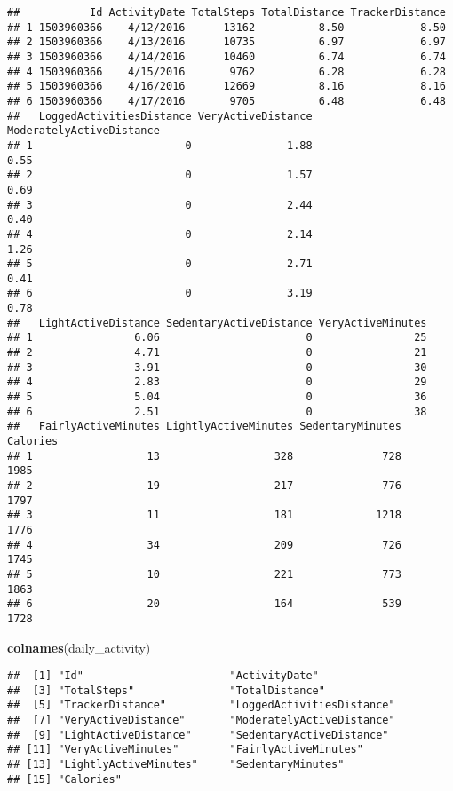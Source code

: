 \documentclass[
]{article}
\newenvironment{Shaded}{\begin{snugshade}}{\end{snugshade}}
\newcommand{\FunctionTok}[1]{\textcolor[rgb]{0.13,0.29,0.53}{\textbf{#1}}}
\newcommand{\NormalTok}[1]{#1}
\begin{document}
\begin{verbatim}
##           Id ActivityDate TotalSteps TotalDistance TrackerDistance
## 1 1503960366    4/12/2016      13162          8.50            8.50
## 2 1503960366    4/13/2016      10735          6.97            6.97
## 3 1503960366    4/14/2016      10460          6.74            6.74
## 4 1503960366    4/15/2016       9762          6.28            6.28
## 5 1503960366    4/16/2016      12669          8.16            8.16
## 6 1503960366    4/17/2016       9705          6.48            6.48
##   LoggedActivitiesDistance VeryActiveDistance ModeratelyActiveDistance
## 1                        0               1.88                     0.55
## 2                        0               1.57                     0.69
## 3                        0               2.44                     0.40
## 4                        0               2.14                     1.26
## 5                        0               2.71                     0.41
## 6                        0               3.19                     0.78
##   LightActiveDistance SedentaryActiveDistance VeryActiveMinutes
## 1                6.06                       0                25
## 2                4.71                       0                21
## 3                3.91                       0                30
## 4                2.83                       0                29
## 5                5.04                       0                36
## 6                2.51                       0                38
##   FairlyActiveMinutes LightlyActiveMinutes SedentaryMinutes Calories
## 1                  13                  328              728     1985
## 2                  19                  217              776     1797
## 3                  11                  181             1218     1776
## 4                  34                  209              726     1745
## 5                  10                  221              773     1863
## 6                  20                  164              539     1728
\end{verbatim}

\begin{Shaded}
\begin{Highlighting}[]
\FunctionTok{colnames}\NormalTok{(daily\_activity)}
\end{Highlighting}
\end{Shaded}

\begin{verbatim}
##  [1] "Id"                       "ActivityDate"            
##  [3] "TotalSteps"               "TotalDistance"           
##  [5] "TrackerDistance"          "LoggedActivitiesDistance"
##  [7] "VeryActiveDistance"       "ModeratelyActiveDistance"
##  [9] "LightActiveDistance"      "SedentaryActiveDistance" 
## [11] "VeryActiveMinutes"        "FairlyActiveMinutes"     
## [13] "LightlyActiveMinutes"     "SedentaryMinutes"        
## [15] "Calories"
\end{verbatim}
\end{document}
